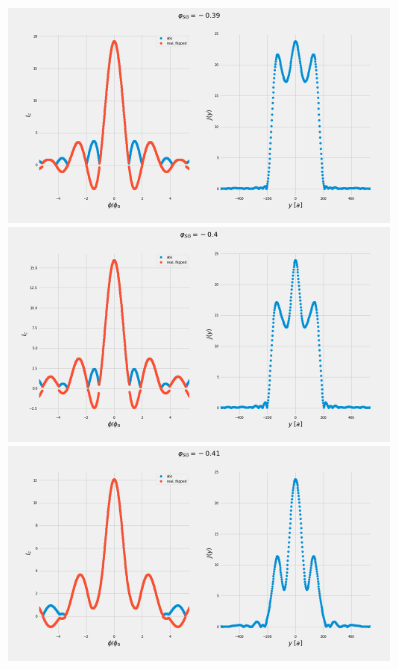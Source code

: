 \documentclass[a4paper]{article}
\begin{document}
\begin{figure}
	\includegraphics[width=0.9\textwidth]{figs/wg32double/current_and_density_039}
	\includegraphics[width=0.9\textwidth]{figs/wg32double/current_and_density_04}
	\includegraphics[width=0.9\textwidth]{figs/wg32double/current_and_density_041}
	
\end{figure}
\end{document}
